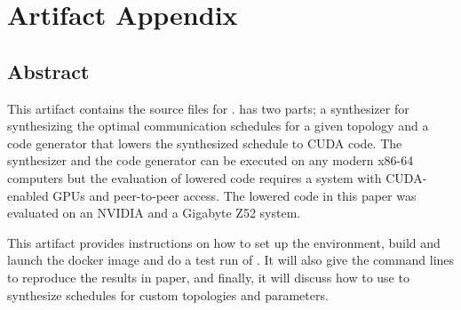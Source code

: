 \section{Artifact Appendix}
\subsection{Abstract}
This artifact contains the source files for \tool. \tool{} has two parts; a synthesizer for synthesizing the optimal communication schedules 
for a given topology and a code generator that lowers the synthesized schedule to CUDA code. 
The synthesizer and the code generator can be executed on any modern x86-64 computers but
the evaluation of lowered code requires a system with CUDA-enabled GPUs and peer-to-peer access. The lowered code
in this paper was evaluated on an NVIDIA \dgxone and a Gigabyte Z52 system. 

This artifact provides instructions on 
how to set up the environment, build and launch the docker image and do a test run of \tool{}. 
It will also give the command lines to reproduce the results in paper, and finally, it will discuss
how to use \tool{} to synthesize schedules for custom topologies and parameters.

